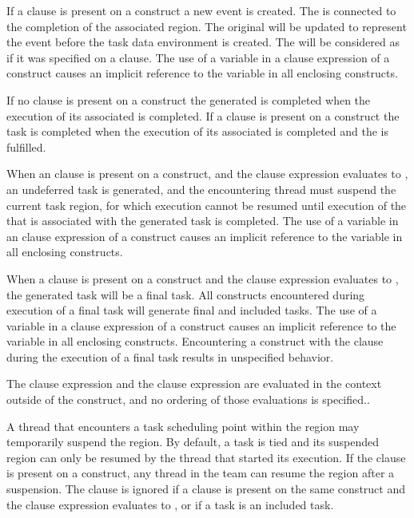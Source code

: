 If a  clause is present on a  construct a new event 
 is created. The 
 is connected to the completion of the associated 
 region. The original  will be updated to represent 
the  event before the task data environment is 
created. The  will be considered as if it was specified on 
a  clause. The use of a variable in a  clause 
expression of a  construct causes an implicit reference to the 
variable in all enclosing constructs.

If no  clause is present on a  construct the generated 
 is completed when the execution of its associated 
 is completed. If a  clause is present on a 
 construct the task is completed when the execution of its associated 
 is completed and the  
is fulfilled.

When an  clause is present on a  construct, and the  
clause expression evaluates to , an undeferred task is generated, and 
the encountering thread must suspend the current task region, for which execution 
cannot be resumed until execution of the  that is associated
with the generated task is completed. The use of a variable in 
an  clause expression of a  construct causes an implicit 
reference to the variable in all enclosing constructs.

When a  clause is present on a  construct and the 
 clause expression evaluates to , the generated task 
will be a final task. All  constructs encountered during execution 
of a final task will generate final and included tasks. The use of a variable 
in a  clause expression of a  construct causes an
implicit reference to the variable in all enclosing constructs. Encountering 
a  construct with the  clause during the execution 
of a final task results in unspecified behavior.

The  clause expression and the  clause expression are 
evaluated in the context outside of the  construct, and no ordering 
of those evaluations is specified..

A thread that encounters a task scheduling point within the  region 
may temporarily suspend the  region. By default, a task is tied and 
its suspended  region can only be resumed by the thread that started 
its execution. If the  clause is present on a  construct, 
any thread in the team can resume the  region after a suspension. The 
 clause is ignored if a  clause is present on the same 
 construct and the  clause expression evaluates to 
, or if a task is an included task.

